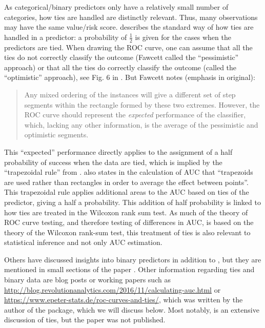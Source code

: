 \documentclass[article]{jss}
\begin{document}
As categorical/binary predictors only have a relatively small number of
categories, how ties are handled are distinctly relevant. Thus, many
observations may have the same value/risk score.
\citet{fawcett2006introduction} describes the standard way of how ties
are handled in a predictor: a probability of \(\frac{1}{2}\) is given
for the cases when the predictors are tied. When drawing the ROC curve,
one can assume that all the ties do not correctly classify the outcome
(Fawcett called the ``pessimistic'' approach) or that all the ties do
correctly classify the outcome (called the ``optimistic'' approach), see
Fig. 6 in \citep{fawcett2006introduction}. But Fawcett notes (emphasis
in original):

\begin{quote}
Any mixed ordering of the instances will give a different set of step
segments within the rectangle formed by these two extremes. However, the
ROC curve should represent the \emph{expected} performance of the
classifier, which, lacking any other information, is the average of the
pessimistic and optimistic segments.
\end{quote}

This ``expected'' performance directly applies to the assignment of a
half probability of success when the data are tied, which is implied by
the ``trapezoidal rule'' from \citet{hanley1982meaning}.
\citet{fawcett2006introduction} also states in the calculation of AUC
that ``trapezoids are used rather than rectangles in order to average
the effect between points''. This trapezoidal rule applies additional
areas to the AUC based on ties of the predictor, giving a half a
probability. This addition of half probability is linked to how ties are
treated in the Wilcoxon rank sum test. As much of the theory of ROC
curve testing, and therefore testing of differences in AUC, is based on
the theory of the Wilcoxon rank-sum test, this treatment of ties is also
relevant to statistical inference and not only AUC estimation.

Others have discussed insights into binary predictors in addition to
\citet{fawcett2006introduction}, but they are mentioned in small
sections of the paper \citep{saito2015precision, pepe2009estimation}.
Other information regarding ties and binary data are blog posts or
working papers such as
\url{http://blog.revolutionanalytics.com/2016/11/calculating-auc.html}
or \url{https://www.epeter-stats.de/roc-curves-and-ties/}, which was
written by the author of the  \citep{fbroc} package, which we
will discuss below. Most notably, \citet{hsu2014inference} is an
extensive discussion of ties, but the paper was not published.
\end{document}
